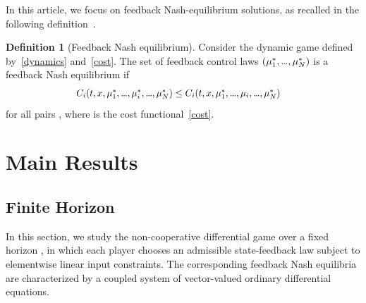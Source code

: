 \documentclass[letterpaper, 10 pt, conference]{ieeeconf}
\newcommand\mydots{\hbox to 0.7em{.\hss.\hss.}}
\theoremstyle{definition}
\newtheorem{defn}{Definition}
\begin{document}
In this article, we focus on feedback Nash-equilibrium solutions, as recalled in the following definition~\cite{basar}.
\begin{defn}[Feedback Nash equilibrium] Consider the dynamic game defined by~\eqref{dynamics} and~\eqref{cost}. The set of feedback control laws $(\mu_{1}^*, \mydots, \mu_{N}^*)$ is a feedback Nash equilibrium if 
\begin{align*}
    &\scalebox{.95}{$C_i(t, x, \mu_{1}^*,\mydots, \mu_{i}^*, \mydots, \mu_{N}^*)\leq C_i(t, x, \mu_{1}^*,\mydots, \mu_{i}, \mydots, \mu_{N}^*)$}
\end{align*}
for all pairs , where  is the cost functional~\eqref{cost}.
\end{defn}
\section{Main Results} 
\subsection{Finite Horizon}
In this section, we study the non-cooperative differential game over a fixed horizon \scalebox{.95}{$[0,T]$}, in which each player chooses an admissible state-feedback law subject to elementwise linear input constraints. 
The corresponding feedback Nash equilibria are characterized by a coupled system of vector-valued ordinary differential equations.
\end{document}
